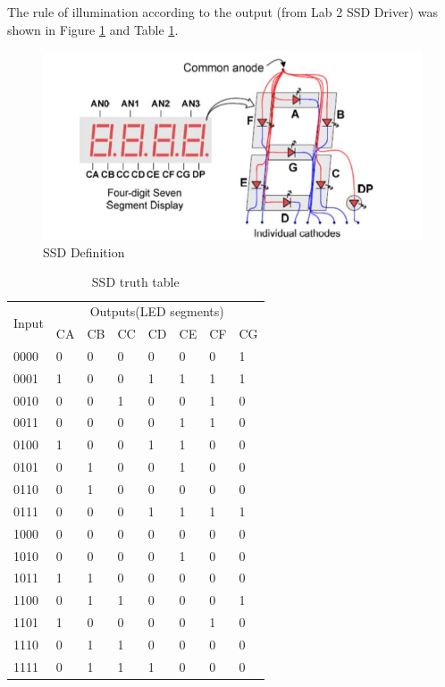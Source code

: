 \documentclass{article}
\begin{document}
\newpage
The rule of illumination according to the output (from Lab 2 SSD Driver) was shown in Figure \ref{ssd-fig} and Table \ref{ssd-table}.

\begin{figure}[!htbp]
\centering
\includegraphics[width=0.65\linewidth]{SSD.jpg}
\caption{SSD Definition}
\label{ssd-fig}
\end{figure}

\begin{table}[!hbtp]
\centering
\begin{tabular}{|p{1cm}<{\centering}|p{1cm}<{\centering}|p{1cm}<{\centering}|p{1cm}<{\centering}|p{1cm}<{\centering}|p{1cm}<{\centering}|p{1cm}<{\centering}|p{1cm}<{\centering}|}
\hline
\multirow{2}{*}{Input} & \multicolumn{7}{c|}{ Outputs(LED segments) }\\\cline{2-8}
& CA & CB & CC & CD & CE & CF & CG \\\hline
0000 & 0 & 0 & 0 & 0 & 0 & 0 & 1 \\\hline
0001 & 1 & 0 & 0 & 1 & 1 & 1 & 1 \\\hline
0010 & 0 & 0 & 1 & 0 & 0 & 1 & 0 \\\hline
0011 & 0 & 0 & 0 & 0 & 1 & 1 & 0 \\\hline
0100 & 1 & 0 & 0 & 1 & 1 & 0 & 0 \\\hline
0101 & 0 & 1 & 0 & 0 & 1 & 0 & 0 \\\hline
0110 & 0 & 1 & 0 & 0 & 0 & 0 & 0 \\\hline
0111 & 0 & 0 & 0 & 1 & 1 & 1 & 1 \\\hline
1000 & 0 & 0 & 0 & 0 & 0 & 0 & 0 \\\hline
1010 & 0 & 0 & 0 & 0 & 1 & 0 & 0 \\\hline
1011 & 1 & 1 & 0 & 0 & 0 & 0 & 0 \\\hline
1100 & 0 & 1 & 1 & 0 & 0 & 0 & 1 \\\hline
1101 & 1 & 0 & 0 & 0 & 0 & 1 & 0 \\\hline
1110 & 0 & 1 & 1 & 0 & 0 & 0 & 0 \\\hline
1111 & 0 & 1 & 1 & 1 & 0 & 0 & 0 \\\hline
\end{tabular}
\caption{SSD truth table}
\label{ssd-table}
\end{table}
\end{document}
